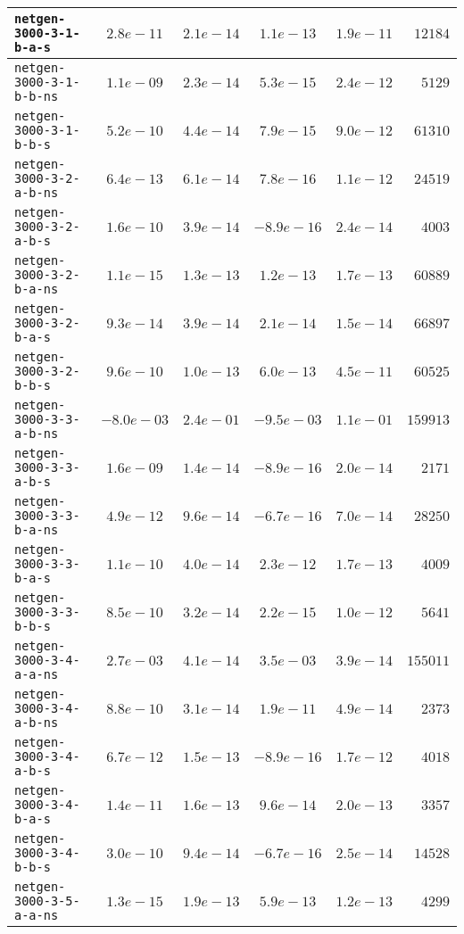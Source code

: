 \begin{center}
\begin{longtable}{|l || c | c | c | c | r|}
\hline
\texttt{netgen-3000-3-1-b-a-s} & $2.8e-11$ & $2.1e-14$ & $1.1e-13$ & $1.9e-11$ & $12184$ \\
\hline
\texttt{netgen-3000-3-1-b-b-ns} & $1.1e-09$ & $2.3e-14$ & $5.3e-15$ & $2.4e-12$ & $5129$ \\
\hline
\texttt{netgen-3000-3-1-b-b-s} & $5.2e-10$ & $4.4e-14$ & $7.9e-15$ & $9.0e-12$ & $61310$ \\
\hline
\texttt{netgen-3000-3-2-a-b-ns} & $6.4e-13$ & $6.1e-14$ & $7.8e-16$ & $1.1e-12$ & $24519$ \\
\hline
\texttt{netgen-3000-3-2-a-b-s} & $1.6e-10$ & $3.9e-14$ & $-8.9e-16$ & $2.4e-14$ & $4003$ \\
\hline
\texttt{netgen-3000-3-2-b-a-ns} & $1.1e-15$ & $1.3e-13$ & $1.2e-13$ & $1.7e-13$ & $60889$ \\
\hline
\texttt{netgen-3000-3-2-b-a-s} & $9.3e-14$ & $3.9e-14$ & $2.1e-14$ & $1.5e-14$ & $66897$ \\
\hline
\texttt{netgen-3000-3-2-b-b-s} & $9.6e-10$ & $1.0e-13$ & $6.0e-13$ & $4.5e-11$ & $60525$ \\
\hline
\texttt{netgen-3000-3-3-a-b-ns} & $-8.0e-03$ & $2.4e-01$ & $-9.5e-03$ & $1.1e-01$ & $159913$ \\
\hline
\texttt{netgen-3000-3-3-a-b-s} & $1.6e-09$ & $1.4e-14$ & $-8.9e-16$ & $2.0e-14$ & $2171$ \\
\hline
\texttt{netgen-3000-3-3-b-a-ns} & $4.9e-12$ & $9.6e-14$ & $-6.7e-16$ & $7.0e-14$ & $28250$ \\
\hline
\texttt{netgen-3000-3-3-b-a-s} & $1.1e-10$ & $4.0e-14$ & $2.3e-12$ & $1.7e-13$ & $4009$ \\
\hline
\texttt{netgen-3000-3-3-b-b-s} & $8.5e-10$ & $3.2e-14$ & $2.2e-15$ & $1.0e-12$ & $5641$ \\
\hline
\texttt{netgen-3000-3-4-a-a-ns} & $2.7e-03$ & $4.1e-14$ & $3.5e-03$ & $3.9e-14$ & $155011$ \\
\hline
\texttt{netgen-3000-3-4-a-b-ns} & $8.8e-10$ & $3.1e-14$ & $1.9e-11$ & $4.9e-14$ & $2373$ \\
\hline
\texttt{netgen-3000-3-4-a-b-s} & $6.7e-12$ & $1.5e-13$ & $-8.9e-16$ & $1.7e-12$ & $4018$ \\
\hline
\texttt{netgen-3000-3-4-b-a-s} & $1.4e-11$ & $1.6e-13$ & $9.6e-14$ & $2.0e-13$ & $3357$ \\
\hline
\texttt{netgen-3000-3-4-b-b-s} & $3.0e-10$ & $9.4e-14$ & $-6.7e-16$ & $2.5e-14$ & $14528$ \\
\hline
\texttt{netgen-3000-3-5-a-a-ns} & $1.3e-15$ & $1.9e-13$ & $5.9e-13$ & $1.2e-13$ & $4299$ \\

\end{longtable}
\end{center}
